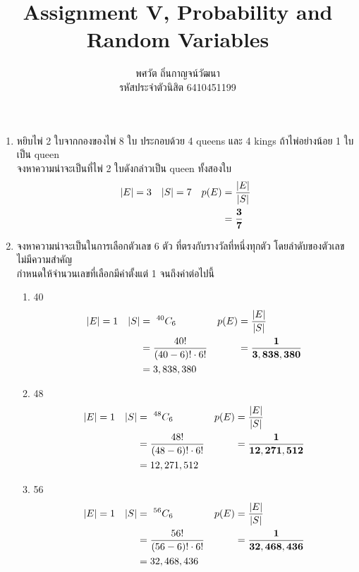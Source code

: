 \documentclass{article}
\title{\textbf{Assignment V, Probability and Random Variables}}
\author{พศวัต ถิ่นกาญจน์วัฒนา \\
รหัสประจำตัวนิสิต 6410451199}
\date{}
\begin{document}
\maketitle

\flushleft
\renewcommand{\labelenumii}{\arabic{enumii})}

\begin{enumerate}

\item{หยิบไพ่ 2 ใบจากกองของไพ่ 8 ใบ ประกอบด้วย 4 queens และ 4 kings ถ้าไพ่อย่างน้อย 1 ใบ เป็น
queen \\
จงหาความน่าจะเป็นที่ไพ่ 2 ใบดังกล่าวเป็น queen ทั้งสองใบ}
\begin{align*}
|E|	&= 3		&		|S|	&= 7		&		p(E)	&= \frac{|E|}{|S|}			\notag \\
	&			&			&			&				&= \mathbf{\frac{3}{7}}
\end{align*}

\item{จงหาความน่าจะเป็นในการเลือกตัวเลข 6 ตัว ที่ตรงกับรางวัลที่หนึ่งทุกตัว โดยลำดับของตัวเลขไม่มีความสำคัญ \\
กำหนดให้จำนวนเลขที่เลือกมีค่าตั้งแต่ 1 จนถึงค่าต่อไปนี้}
	\begin{enumerate}
	
	\item{40}
	\begin{align*}
	|E|	&= 1		&		|S|	&= ~^{40}C_6							&		p(E)	&= \frac{|E|}{|S|}				\notag \\
		&			&			&= \frac{40!}{(40 - 6)! \cdot 6!}		&				&= \mathbf{\frac{1}{3,838,380}}	\\
		&			&			&= 3,838,380
	\end{align*}
	
	\item{48}
	\begin{align*}
	|E|	&= 1		&		|S|	&= ~^{48}C_6							&		p(E)	&= \frac{|E|}{|S|}					\notag \\
		&			&			&= \frac{48!}{(48 - 6)! \cdot 6!}		&				&= \mathbf{\frac{1}{12,271,512}}	\\
		&			&			&= 12,271,512
	\end{align*}
	
	\item{56}
	\begin{align*}
	|E|	&= 1		&		|S|	&= ~^{56}C_6							&		p(E)	&= \frac{|E|}{|S|}					\notag \\
		&			&			&= \frac{56!}{(56 - 6)! \cdot 6!}		&				&= \mathbf{\frac{1}{32,468,436}}	\\
		&			&			&= 32,468,436
	\end{align*}
	

\end{enumerate}
\end{enumerate}
\end{document}
